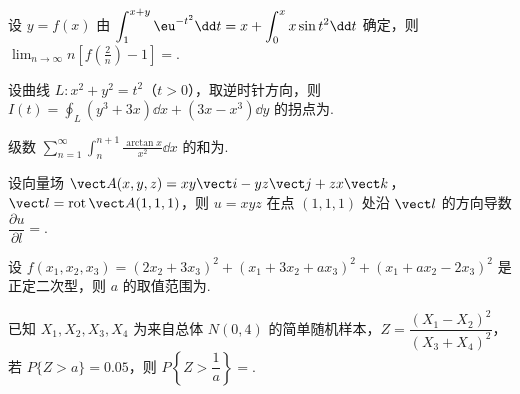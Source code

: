 \begin{question}[index=11]
设 $y=f(x)$ 由 $\displaystyle\int_1^{x+y}\eu^{-t^2}\dd t=x+\int_0^xx\sin t^2\dd t$ 确定，则 $\displaystyle\lim_{n\to\infty}n\left[f\!\left(\frac2n\right)-1\right]=$\fillin.
\end{question}
\QuestionBreak

\begin{question}[index=12]
设曲线 $L:x^2+y^2=t^2$（$t>0$），取逆时针方向，则 $\displaystyle I(t)=\oint_L(y^3+3x)\dd x+(3x-x^3)\dd y$ 的拐点为\fillin.
\end{question}
\QuestionBreak

\begin{question}[index=13]
级数 $\displaystyle\sum_{n=1}^\infty\int_n^{n+1}\frac{\arctan x}{x^2}\dd x$ 的和为\fillin.
\end{question}
\QuestionBreak

\begin{question}[index=14]
设向量场 $\vect A(x,y,z)=xy\vect i-yz\vect j+zx\vect k$，$\vect l=\operatorname{rot}\vect A(1,1,1)$，则 $u=xyz$ 在点 $(1,1,1)$ 处沿 $\vect l$ 的方向导数 $\dfrac{\partial u}{\partial l}=$\fillin.
\end{question}
\QuestionBreak

\begin{question}[index=15]
设 $f(x_1,x_2,x_3)=(2x_2+3x_3)^2+(x_1+3x_2+ax_3)^2+(x_1+ax_2-2x_3)^2$ 是正定二次型，则 $a$ 的取值范围为\fillin.
\end{question}
\QuestionBreak

\begin{question}[index=16]
已知 $X_1,X_2,X_3,X_4$ 为来自总体 $N(0,4)$ 的简单随机样本，$Z=\dfrac{(X_1-X_2)^2}{(X_3+X_4)^2}$，若 $P\{Z>a\}=0.05$，则 $P\!\left\{Z>\dfrac1a\right\}=$\fillin.
\end{question}
